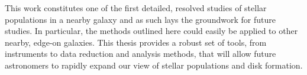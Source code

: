 This work constitutes one of the first detailed, resolved studies of
stellar populations in a nearby galaxy and as such lays the groundwork
for future studies. In particular, the methods outlined here could
easily be applied to other nearby, edge-on galaxies. This thesis
provides a robust set of tools, from instruments to data reduction and
analysis methods, that will allow future astronomers to rapidly expand
our view of stellar populations and disk formation.

\clearpage
{} %



